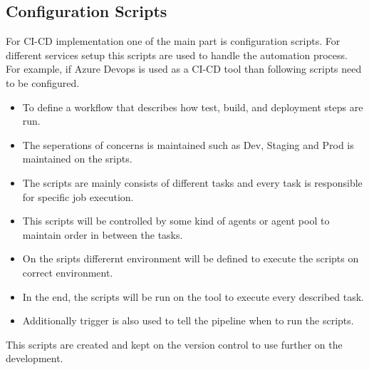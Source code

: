 \subsection{Configuration Scripts}
For CI-CD implementation one of the main part is configuration scripts. For different services setup this scripts are used to handle the automation process. For example, if Azure Devops is used as a CI-CD tool than following scripts need to be configured.
\begin{itemize}
     \item To define a workflow that describes how test, build, and deployment steps are run.
     \item The seperations of concerns is maintained such as Dev, Staging and Prod is maintained on the sripts.
     \item The scripts are mainly consists of different tasks and every task is responsible for specific job execution.
     \item This scripts will be controlled by some kind of agents or agent pool to maintain order in between the tasks.
     \item On the sripts differernt environment will be defined to execute the scripts on correct environment.
     \item In the end, the scripts will be run on the tool to execute every described task.
     \item Additionally trigger is also used to tell the pipeline when to run the scripts.
\end{itemize}
This scripts are created and kept on the version control to use further on the development.
